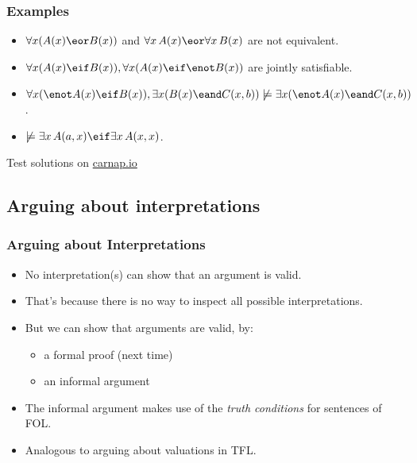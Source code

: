 \begin{frame}
\frametitle{Examples}

\begin{itemize}[<+->]
  \item $\forall x(A(x) \eor B(x))$ and $\forall x\,A(x) \eor \forall x\,B(x)$ are not equivalent.
  \item  $\forall x(A(x) \eif B(x)), \forall x(A(x) \eif \enot B(x))$ are jointly satisfiable.
  \item $\forall x(\enot A(x) \eif B(x)), \exists x(B(x) \eand C(x,b))
  \not\models \exists x(\enot A(x) \eand C(x,b))$.
  \item $\not\models \exists x\, A(a,x) \eif \exists x\, A(x,x)$.
\end{itemize}
Test solutions on \href{https://carnap.io/shared/rzach@ucalgary.ca/Practice\%20Problems\%20VI.md}{carnap.io}
\end{frame}

\subsection{Arguing about interpretations}

\begin{frame}
\frametitle{Arguing about Interpretations}

\begin{itemize}[<+->]
  \item No interpretation(s) can show that an argument is valid.
  \item That's because there is no way to inspect all possible interpretations.
  \item But we can show that arguments are valid, by:
  \begin{itemize}
    \item a formal proof (next time)
    \item an informal argument
  \end{itemize}
  \item The informal argument makes use of the \emph{truth conditions}
  for sentences of FOL.
  \item Analogous to arguing about valuations in TFL.
\end{itemize}

\end{frame}

